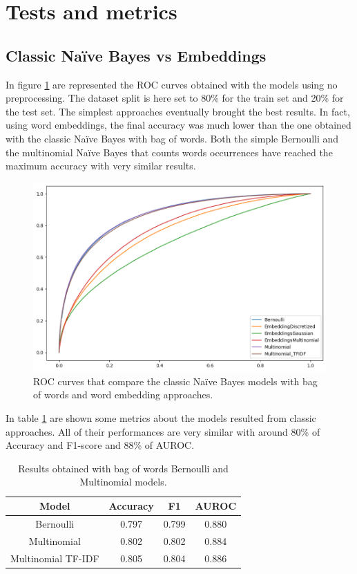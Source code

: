 \section*{Tests and metrics}

\subsection*{Classic Na\"ive Bayes vs Embeddings}

In figure \ref{fig:classic_nb_vs_embeddings} are represented the ROC curves obtained with the models 
using no preprocessing. The dataset split is here set to 80\% for the train set and 20\% for the test set.
The simplest approaches eventually brought the best results. In fact, using word embeddings, the final
accuracy was much lower than the one obtained with the classic Na\"ive Bayes with bag of words. 
Both the simple Bernoulli and the multinomial Na\"ive Bayes that counts words occurrences 
have reached the maximum accuracy with very similar results.

\begin{figure}[h!t]
    \centering
    \includegraphics[scale=0.30]{../experiments/plots/classic_nb_vs_embeddings}
    \caption{ROC curves that compare the classic Na\"ive Bayes models with bag of words and
    word embedding approaches.}
    \label{fig:classic_nb_vs_embeddings}        
\end{figure}

In table \ref{tab:classic_nb_vs_embeddings} are shown some metrics about the models resulted from 
classic approaches. All of their performances are very similar with around 80\% of Accuracy and 
F1-score and 88\% of AUROC. 

\begin{table}[h!t]
    \centering
    \caption{Results obtained with bag of words Bernoulli and Multinomial models.}
    \label{tab:classic_nb_vs_embeddings}
    \begin{tabular}{c|ccc}
        \hline
        Model & Accuracy & F1 & AUROC \\
        \hline 
        Bernoulli & 0.797 & 0.799 & 0.880 \\ 
        Multinomial & 0.802 & 0.802 & 0.884 \\ 
        Multinomial TF-IDF & 0.805 & 0.804 & 0.886 \\ 
        \hline
    \end{tabular}
\end{table}

